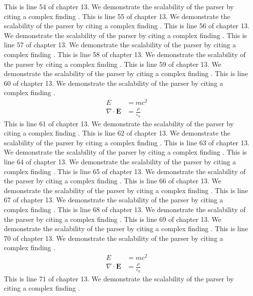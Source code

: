 This is line 54 of chapter 13. We demonstrate the scalability of the parser by citing a complex finding \cite{ref13_54}.
This is line 55 of chapter 13. We demonstrate the scalability of the parser by citing a complex finding \cite{ref13_55}.
This is line 56 of chapter 13. We demonstrate the scalability of the parser by citing a complex finding \cite{ref13_56}.
This is line 57 of chapter 13. We demonstrate the scalability of the parser by citing a complex finding \cite{ref13_57}.
This is line 58 of chapter 13. We demonstrate the scalability of the parser by citing a complex finding \cite{ref13_58}.
This is line 59 of chapter 13. We demonstrate the scalability of the parser by citing a complex finding \cite{ref13_59}.
This is line 60 of chapter 13. We demonstrate the scalability of the parser by citing a complex finding \cite{ref13_60}.
\begin{align*}
  E &= mc^2 \\
  \nabla \cdot \mathbf{E} &= \frac{\rho}{\varepsilon_0}
\end{align*}
This is line 61 of chapter 13. We demonstrate the scalability of the parser by citing a complex finding \cite{ref13_61}.
This is line 62 of chapter 13. We demonstrate the scalability of the parser by citing a complex finding \cite{ref13_62}.
This is line 63 of chapter 13. We demonstrate the scalability of the parser by citing a complex finding \cite{ref13_63}.
This is line 64 of chapter 13. We demonstrate the scalability of the parser by citing a complex finding \cite{ref13_64}.
This is line 65 of chapter 13. We demonstrate the scalability of the parser by citing a complex finding \cite{ref13_65}.
This is line 66 of chapter 13. We demonstrate the scalability of the parser by citing a complex finding \cite{ref13_66}.
This is line 67 of chapter 13. We demonstrate the scalability of the parser by citing a complex finding \cite{ref13_67}.
This is line 68 of chapter 13. We demonstrate the scalability of the parser by citing a complex finding \cite{ref13_68}.
This is line 69 of chapter 13. We demonstrate the scalability of the parser by citing a complex finding \cite{ref13_69}.
This is line 70 of chapter 13. We demonstrate the scalability of the parser by citing a complex finding \cite{ref13_70}.
\begin{align*}
  E &= mc^2 \\
  \nabla \cdot \mathbf{E} &= \frac{\rho}{\varepsilon_0}
\end{align*}
This is line 71 of chapter 13. We demonstrate the scalability of the parser by citing a complex finding \cite{ref13_71}.
